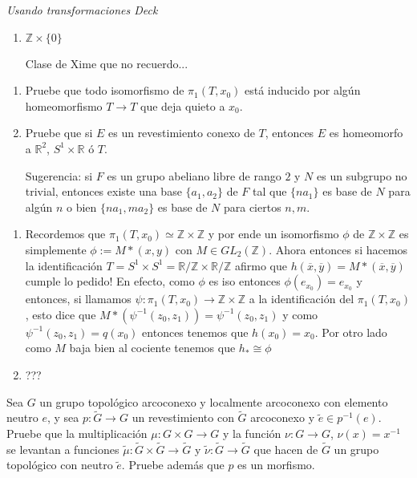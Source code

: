 \documentclass[11pt]{article}
\newcommand{\R}{{\mathbb{R}}}
\newcommand{\sett}[1]{\{#1\}}
\newenvironment{proof}[1][Demostraci\'on]{\begin{trivlist}
\item[\hskip \labelsep {\bfseries #1}]}{\end{trivlist}}
\newcommand{\qed}{\nobreak \ifvmode \relax \else
      \ifdim\lastskip<1.5em \hskip-\lastskip
      \hskip1.5em plus0em minus0.5em \fi \nobreak
      \vrule height0.75em width0.5em depth0.25em\fi}
\newcommand{\Z}{\mathbb{Z}}
\def \be{\begin{enumerate}}
\def \en{\end{enumerate}}
\begin{document}
\begin{enumerate}
\begin{proof}
\textit{Usando transformaciones Deck}

\begin{enumerate}

\item {$\Z \times \sett{0}$}

Clase de Xime que no recuerdo...

\end{enumerate}

\end{proof}

\item{
\be	\item {Pruebe que todo isomorfismo de $\pi_1(T,x_0)$ est\'a inducido por alg\'un homeomorfismo $T\to T$ que deja quieto a $x_0$.}
		\item {Pruebe que si $E$ es un revestimiento conexo de $T$, entonces $E$ es homeomorfo a $\R^2$, $S^1\times\R$ \'o $T$.}
		
		Sugerencia: si $F$ es un grupo abeliano libre de rango $2$ y $N$ es un subgrupo no trivial, entonces existe una base $\{a_1, a_2\}$ de $F$ tal que $\{na_1\}$ es base de $N$ para alg\'un $n$ o bien $\{na_1, ma_2\}$ es base de $N$ para ciertos $n,m$.
		\en
}

\begin{proof}

\begin{enumerate}

\item Recordemos que $\pi_1(T,x_0) \simeq \Z \times \Z$ y por ende un isomorfismo $\phi$ de $\Z \times \Z$ es simplemente $\phi:=M*(x,y)$ con $M \in GL_2(\Z)$. Ahora entonces si hacemos la identificaci\'on $T = S^1 \times S^1 = \R / \Z \times \R / \Z$ afirmo que $h (\overline{x},\overline{y})=M*(\overline{x},\overline{y})$ cumple lo pedido! En efecto,  como $\phi$ es iso entonces $\phi(e_{x_0})=e_{x_0}$ y entonces, si llamamos $\psi : \pi_1(T,x_0) \rightarrow \Z \times \Z$ a la identificaci\'on del $\pi_1(T,x_0)$, esto dice que $M*(\psi^{-1}(z_0,z_1))=\psi^{-1}(z_0,z_1)$ y como $\psi^{-1}(z_0,z_1)=q(x_0)$ entonces tenemos que $h(x_0)=x_0$. Por otro lado como $M$ baja bien al cociente tenemos que $h_* \cong \phi$ \qed

\item ???

\end{enumerate}

\end{proof}

\item{
Sea $G$ un grupo topol\'ogico arcoconexo y localmente arcoconexo con elemento neutro $e$, y sea $p:\tilde G\to G$ un revestimiento con $\tilde G$ arcoconexo y $\tilde e\in p^{-1}(e)$. 
Pruebe que la multiplicaci\'on $\mu:G\times G\to G$ y la funci\'on $\nu:G\to G$, $\nu(x)=x^{-1}$ se levantan a funciones $\tilde \mu:\tilde G\times \tilde G\to \tilde G$  y $\tilde \nu:\tilde G\to \tilde G$ que hacen de $\tilde G$ un grupo topol\'ogico con neutro $\tilde e$. Pruebe adem\'as que $p$ es un morfismo.
}


\end{enumerate}
\end{document}

